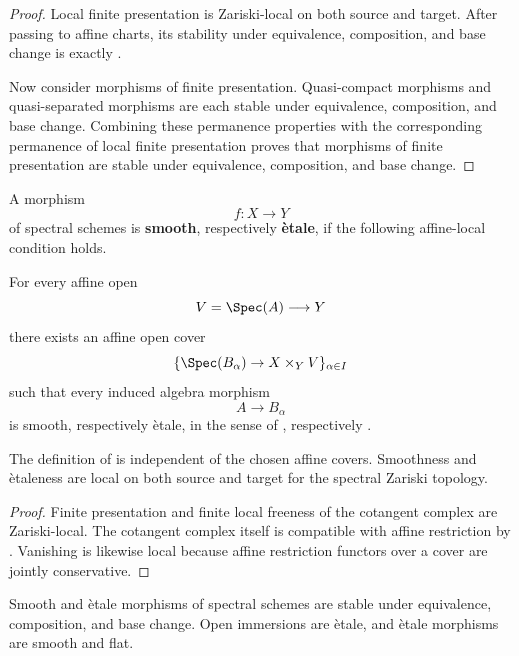 \begin{proof}
Local finite presentation is Zariski-local on both source and target.
After passing to affine charts, its stability under equivalence,
composition, and base change is exactly
.

Now consider morphisms of finite presentation. Quasi-compact morphisms
and quasi-separated morphisms are each stable under equivalence,
composition, and base change. Combining these permanence properties with
the corresponding permanence of local finite presentation proves that
morphisms of finite presentation are stable under equivalence,
composition, and base change.
\end{proof}

\begin{definition}
\label{def:global-smooth-etale}
A morphism
\[
    f
    \colon
    X
    \longrightarrow
    Y
\]
of spectral schemes is \textbf{smooth}, respectively \textbf{\`etale}, if
the following affine-local condition holds.

For every affine open
\[
    V=\Spec(A)
    \longrightarrow
    Y
\]
there exists an affine open cover
\[
    \{\Spec(B_\alpha)\to X\times_YV\}_{\alpha\in I}
\]
such that every induced algebra morphism
\[
    A
    \longrightarrow
    B_\alpha
\]
is smooth, respectively \`etale, in the sense of
, respectively
.
\end{definition}

\begin{proposition}
\label{prop:smooth-etale-locality}
The definition of  is independent of the
chosen affine covers. Smoothness and \`etaleness are local on both source
and target for the spectral Zariski topology.
\end{proposition}

\begin{proof}
Finite presentation and finite local freeness of the cotangent complex are
Zariski-local. The cotangent complex itself is compatible with affine
restriction by . Vanishing is likewise
local because affine restriction functors over a cover are jointly
conservative.
\end{proof}

\begin{proposition}
\label{prop:global-smooth-etale-permanence}
Smooth and \`etale morphisms of spectral schemes are stable under
equivalence, composition, and base change. Open immersions are \`etale,
and \`etale morphisms are smooth and flat.
\end{proposition}

